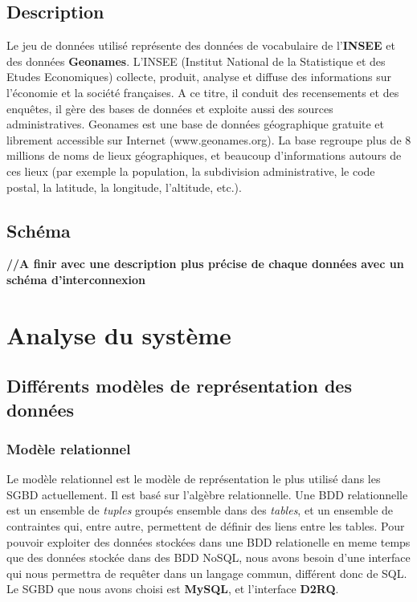 \documentclass{article}
\begin{document}
\subsection{Description}
Le jeu de données utilisé représente des données de vocabulaire de l'\textbf{INSEE} et des données\textbf{ Geonames}.
L’INSEE (Institut National de la Statistique et des Etudes Economiques) collecte, produit, analyse et diffuse des informations sur l'économie et la société françaises. A ce titre, il conduit des recensements et des enquêtes, il gère des bases de données et exploite aussi des sources administratives.
Geonames est une base de données géographique gratuite et librement accessible sur Internet (www.geonames.org). La base regroupe plus de 8 millions de noms de lieux géographiques, et beaucoup d’informations autours de ces lieux (par exemple la  population, la subdivision administrative, le code postal, la latitude, la longitude, l'altitude, etc.). 
\\
\subsection{Schéma}


\textbf{//A finir avec une description plus précise de chaque données avec un schéma d'interconnexion
}

\section{Analyse du système}

\subsection{Différents modèles de représentation des données}

\subsubsection{Modèle relationnel}
Le modèle relationnel est le modèle de représentation le plus utilisé dans les SGBD actuellement. Il est basé sur l'algèbre relationnelle. Une BDD relationnelle est un ensemble de \textit{tuples} groupés ensemble dans des \textit{tables}, et un ensemble de contraintes qui, entre autre, permettent de définir des liens entre les tables.
Pour pouvoir exploiter des données stockées dans une BDD relationelle en meme temps que des données stockée dans des BDD NoSQL, nous avons besoin d'une interface qui nous permettra de requêter dans un langage commun, différent donc de SQL.\\
Le SGBD que nous avons choisi est \textbf{MySQL}, et l'interface \textbf{D2RQ}.
\end{document}

